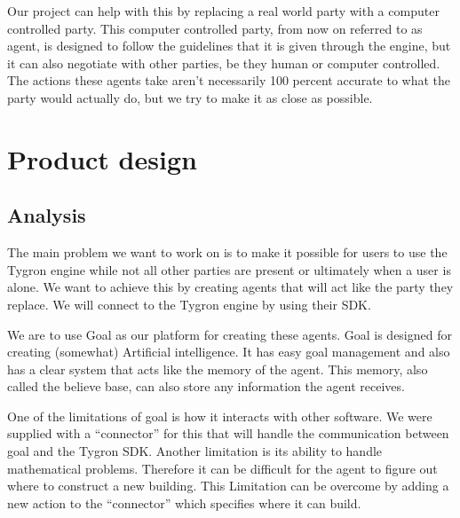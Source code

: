 Our project can help with this by replacing a real world party with a computer controlled party. This computer controlled party, from now on referred to as agent, is designed to follow the guidelines that it is given through the engine, but it can also negotiate with other parties, be they human or computer controlled. The actions these agents take aren’t necessarily 100 percent accurate to what the party would actually do, but we try to make it as close as possible.

\newpage
\section{Product design}
\subsection{Analysis}
The main problem we want to work on is to make it possible for users to use the Tygron engine while not all other parties are present or ultimately when a user is alone. We want to achieve this by creating agents that will act like the party they replace. We will connect to the Tygron engine by using their SDK. 

We are to use Goal as our platform for creating these agents. Goal is designed for creating (somewhat) Artificial intelligence. It has easy goal management and also has a clear system that acts like the memory of the agent. This memory, also called the believe base, can also store any information the agent receives. 

One of the limitations of goal is how it interacts with other software. We were supplied with a “connector” for this that will handle the communication between goal and the Tygron SDK. Another limitation is its ability to handle mathematical problems. Therefore it can be difficult for the agent to figure out where to construct a new building. This Limitation can be overcome by adding a new action to the “connector” which specifies where it can build.
